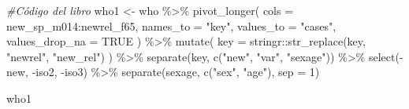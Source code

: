 \documentclass[
]{article}
\newenvironment{Shaded}{\begin{snugshade}}{\end{snugshade}}
\newcommand{\AttributeTok}[1]{\textcolor[rgb]{0.77,0.63,0.00}{#1}}
\newcommand{\CommentTok}[1]{\textcolor[rgb]{0.56,0.35,0.01}{\textit{#1}}}
\newcommand{\ConstantTok}[1]{\textcolor[rgb]{0.00,0.00,0.00}{#1}}
\newcommand{\DecValTok}[1]{\textcolor[rgb]{0.00,0.00,0.81}{#1}}
\newcommand{\FunctionTok}[1]{\textcolor[rgb]{0.00,0.00,0.00}{#1}}
\newcommand{\NormalTok}[1]{#1}
\newcommand{\OtherTok}[1]{\textcolor[rgb]{0.56,0.35,0.01}{#1}}
\newcommand{\SpecialCharTok}[1]{\textcolor[rgb]{0.00,0.00,0.00}{#1}}
\newcommand{\StringTok}[1]{\textcolor[rgb]{0.31,0.60,0.02}{#1}}
\begin{document}
\begin{Shaded}
\begin{Highlighting}[]
\CommentTok{\#Código del libro}
\NormalTok{who1 }\OtherTok{\textless{}{-}}\NormalTok{ who }\SpecialCharTok{\%\textgreater{}\%}
  \FunctionTok{pivot\_longer}\NormalTok{(}
    \AttributeTok{cols =}\NormalTok{ new\_sp\_m014}\SpecialCharTok{:}\NormalTok{newrel\_f65, }
    \AttributeTok{names\_to =} \StringTok{"key"}\NormalTok{, }
    \AttributeTok{values\_to =} \StringTok{"cases"}\NormalTok{, }
    \AttributeTok{values\_drop\_na =} \ConstantTok{TRUE}
\NormalTok{  ) }\SpecialCharTok{\%\textgreater{}\%} 
  \FunctionTok{mutate}\NormalTok{(}
    \AttributeTok{key =}\NormalTok{ stringr}\SpecialCharTok{::}\FunctionTok{str\_replace}\NormalTok{(key, }\StringTok{"newrel"}\NormalTok{, }\StringTok{"new\_rel"}\NormalTok{)}
\NormalTok{  ) }\SpecialCharTok{\%\textgreater{}\%}
  \FunctionTok{separate}\NormalTok{(key, }\FunctionTok{c}\NormalTok{(}\StringTok{"new"}\NormalTok{, }\StringTok{"var"}\NormalTok{, }\StringTok{"sexage"}\NormalTok{)) }\SpecialCharTok{\%\textgreater{}\%} 
  \FunctionTok{select}\NormalTok{(}\SpecialCharTok{{-}}\NormalTok{new, }\SpecialCharTok{{-}}\NormalTok{iso2, }\SpecialCharTok{{-}}\NormalTok{iso3) }\SpecialCharTok{\%\textgreater{}\%} 
  \FunctionTok{separate}\NormalTok{(sexage, }\FunctionTok{c}\NormalTok{(}\StringTok{"sex"}\NormalTok{, }\StringTok{"age"}\NormalTok{), }\AttributeTok{sep =} \DecValTok{1}\NormalTok{)}

\NormalTok{who1}
\end{Highlighting}
\end{Shaded}
\end{document}

